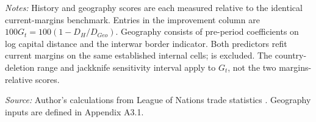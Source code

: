 \begin{table}[!htbp]
\begin{threeparttable}
\begin{tablenotes}[flushleft]\footnotesize\item \textit{Notes:} History and geography scores are each measured relative to the identical current-margins benchmark. Entries in the improvement column are $100G_t=100(1-D_H/D_{Geo})$. Geography consists of pre-period coefficients on log capital distance and the interwar border indicator. Both predictors refit current margins on the same established internal cells; \External{} is excluded. The country-deletion range and jackknife sensitivity interval apply to $G_t$, not the two margins-relative scores.
\item \textit{Source:} Author's calculations from League of Nations trade statistics \parencite{league1930,league1936,league1938}. Geography inputs are defined in Appendix A3.1.
\end{tablenotes}\end{threeparttable}\end{table}
